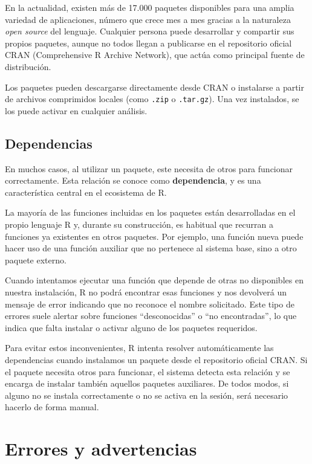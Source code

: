 \documentclass[
  spanish,
  letterpaper,
  DIV=11,
  numbers=noendperiod]{scrreprt}
\begin{document}
En la actualidad, existen más de 17.000 paquetes disponibles para una
amplia variedad de aplicaciones, número que crece mes a mes gracias a la
naturaleza \emph{open source} del lenguaje. Cualquier persona puede
desarrollar y compartir sus propios paquetes, aunque no todos llegan a
publicarse en el repositorio oficial CRAN (Comprehensive R Archive
Network), que actúa como principal fuente de distribución.

Los paquetes pueden descargarse directamente desde CRAN o instalarse a
partir de archivos comprimidos locales (como \texttt{.zip} o
\texttt{.tar.gz}). Una vez instalados, se los puede activar en cualquier
análisis.

\subsection{Dependencias}\label{dependencias}

En muchos casos, al utilizar un paquete, este necesita de otros para
funcionar correctamente. Esta relación se conoce como
\textbf{dependencia}, y es una característica central en el ecosistema
de R.

La mayoría de las funciones incluidas en los paquetes están
desarrolladas en el propio lenguaje R y, durante su construcción, es
habitual que recurran a funciones ya existentes en otros paquetes. Por
ejemplo, una función nueva puede hacer uso de una función auxiliar que
no pertenece al sistema base, sino a otro paquete externo.

Cuando intentamos ejecutar una función que depende de otras no
disponibles en nuestra instalación, R no podrá encontrar esas funciones
y nos devolverá un mensaje de error indicando que no reconoce el nombre
solicitado. Este tipo de errores suele alertar sobre funciones
``desconocidas'' o ``no encontradas'', lo que indica que falta instalar
o activar alguno de los paquetes requeridos.

Para evitar estos inconvenientes, R intenta resolver automáticamente las
dependencias cuando instalamos un paquete desde el repositorio oficial
CRAN. Si el paquete necesita otros para funcionar, el sistema detecta
esta relación y se encarga de instalar también aquellos paquetes
auxiliares. De todos modos, si alguno no se instala correctamente o no
se activa en la sesión, será necesario hacerlo de forma manual.

\section{Errores y advertencias}\label{errores-y-advertencias}
\end{document}
